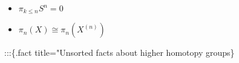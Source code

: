 \begin{example}

\envlist

\begin{itemize}
\tightlist
\item
  \(\pi_{k\leq n}S^n = 0\)
\item
  \(\pi_{n}(X) \cong \pi_{n}(X^{(n)})\)
\end{itemize}

\end{example}

\begin{theorem}

\end{theorem}


:::\{.fact title="Unsorted facts about higher homotopy groups\} \envlist


